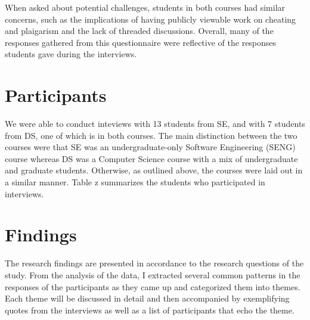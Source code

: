 When asked about potential challenges, students in both courses had similar concerns, such as the implications of having publicly viewable work on cheating and plaigarism and the lack of threaded discussions. Overall, many of the responses gathered from this questionnaire were reflective of the responses students gave during the interviews.

\section{Participants}
We were able to conduct inteviews with 13 students from SE, and with 7 students from DS, one of which is in both courses. The main distinction between the two courses were that SE was an undergraduate-only Software Engineering (SENG) course whereas DS was a Computer Science course with a mix of undergraduate and graduate students. Otherwise, as outlined above, the courses were laid out in a similar manner. Table z summarizes the students who participated in interviews.




\section{Findings}

The research findings are presented in accordance to the research questions of the study. From the analysis of the data, I extracted several common patterns in the responses of the participants as they came up and categorized them into themes. Each theme will be discussed in detail and then accompanied by exemplifying quotes from the interviews as well as a list of participants that echo the theme.

